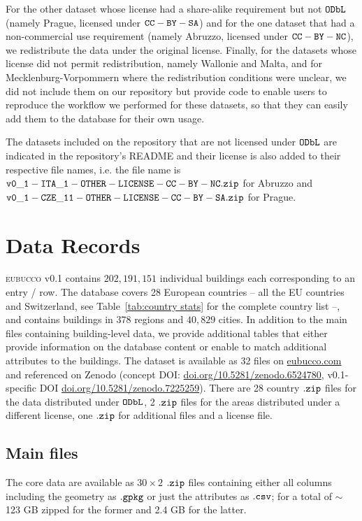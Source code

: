 \documentclass[fleqn,10pt]{wlscirep}
\begin{document}
For the other dataset whose license had a share-alike requirement but not ${\tt ODbL}$ (namely Prague, licensed under ${\tt CC-BY-SA}$) and for the one dataset that had a non-commercial use requirement (namely Abruzzo, licensed under ${\tt CC-BY-NC}$), we redistribute the data under the original license. Finally, for the datasets whose license did not permit redistribution, namely Wallonie and Malta, and for Mecklenburg-Vorpommern where the redistribution conditions were unclear, we did not include them on our repository but provide code to enable users to reproduce the workflow we performed for these datasets, so that they can easily add them to the database for their own usage. 

The datasets included on the repository that are not licensed under ${\tt ODbL}$ are indicated in the repository's README and their license is also added to their respective file names, i.e. the file name is ${\tt v0\_1-ITA\_1-OTHER-LICENSE-CC-BY-NC.zip}$ for Abruzzo and ${\tt v0\_1-CZE\_11-OTHER-LICENSE-CC-BY-SA.zip}$ for Prague.


\section*{Data Records}

\textsc{eubucco} v0.1 \cite{eubucco_v0.1_2022_dataset} contains $202, 191, 151$ individual buildings each corresponding to an entry / row. The database covers 28 European countries -- all the EU countries and Switzerland, see Table~\ref{tab:country stats} for the complete country list --, and contains buildings in 378 regions and $40,829$ cities. In addition to the main files containing building-level data, we provide additional tables that either provide information on the database content or enable to match additional attributes to the buildings. The dataset is available as 32 files on \url{eubucco.com} and referenced on Zenodo (concept DOI: \url{doi.org/10.5281/zenodo.6524780}, v0.1-specific DOI \url{doi.org/10.5281/zenodo.7225259}). There are 28 country ${\tt .zip}$ files for the data distributed under ${\tt ODbL}$, 2 ${\tt .zip}$ files for the areas distributed under a different license, one ${\tt .zip}$ for additional files and a license file.

\subsection*{Main files}

The core data  are available as $30 \times 2$ $\tt{.zip}$ files containing either all columns including the geometry as $\tt{.gpkg}$ or just the attributes as $\tt{.csv}$; for a total of $\sim$ 123 GB zipped for the former and 2.4 GB for the latter.
\end{document}
